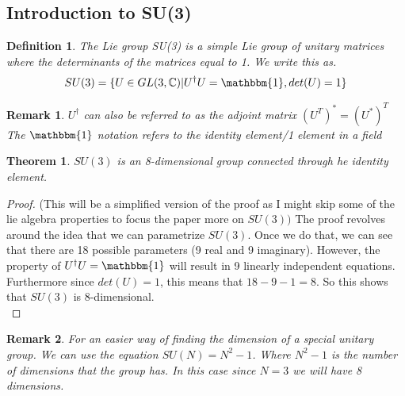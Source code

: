 \documentclass[12pt,journal,compsoc]{IEEEtran}
\newcommand{\C}{\mathbb{C}}
\newtheorem{thm}{Theorem}[section]
\newtheorem{definition}{Definition}
\newtheorem*{rem}{Remark}
\begin{document}
\subsection{Introduction to SU(3)}
\begin{definition}
The Lie group SU(3) is a simple Lie group of unitary matrices where the determinants of the matrices equal to 1. We write this as.
\[ SU(3) = \{ U \in GL(3,\C) | U^{\dagger} U = \mathbbm{1}, det(U) = 1 \} \]
\end{definition}
\begin{rem}
$U^{\dagger}$ can also be referred to as the adjoint matrix $(U^T)^* = (U^*)^T$\\
The $\mathbbm{1}$ notation refers to the identity element/1 element in a field
\end{rem}
\begin{thm}
$SU(3)$ is an 8-dimensional group connected through he identity element.\\
\end{thm}
\begin{proof}
(This will be a simplified version of the proof as I might skip some of the lie algebra properties to focus the paper more on $SU(3))$ The proof revolves around the idea that we can parametrize $SU(3)$. Once we do that, we can see that there are 18 possible parameters (9 real and 9 imaginary). However, the property of $U^{\dagger}U = \mathbbm{1}$ will result in 9 linearly independent equations. Furthermore since $det(U) = 1$, this means that $18 -9 -1 =8$. So this shows that $SU(3)$ is 8-dimensional.\\
\end{proof}
\begin{rem}
For an easier way of finding the dimension of a special unitary group. We can use the equation $SU(N) = N^2 - 1$. Where $N^2 - 1$ is the number of dimensions that the group has. In this case since $N = 3$ we will have 8 dimensions.
\end{rem}
\end{document}
